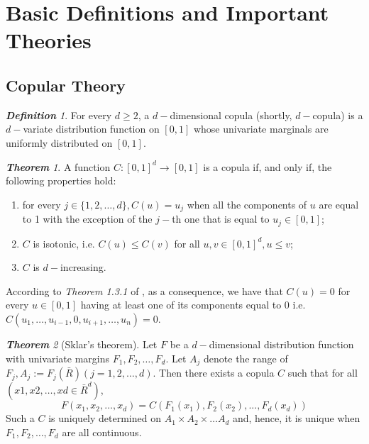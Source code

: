 \documentclass[12pt,oneside,a4paper]{book}
\theoremstyle{definition}
\theoremstyle{remark}
\newtheorem{defn}{\bf Definition}[subsection]
\newtheorem{thm}{\bf Theorem}[subsection]
\begin{document}
		\section{Basic Definitions and Important Theories}
			\subsection{Copular Theory}
				\begin{defn} \label{dfn:copula}\cite{jaworski2010copula}
					For every $d \ge 2$, a $d-$dimensional copula (shortly, $d-$copula) is a
					$d-$variate distribution function on $[0,1]$ whose univariate marginals are uniformly distributed on $[0,1]$.
				\end{defn}

				\begin{thm}
					A function $C: [0,1]^d \rightarrow [0,1]$  is a copula if, and only if, the following properties
					hold:
					\begin{enumerate}
						\item for every $j \in \{1,2, \dots ,d\}, C(u) = u_j$ when all the components of $u$ are
						equal to 1 with the exception of the $j-$th one that is equal to $u_j \in [0,1]$;
						\item $C$ is isotonic, i.e. $C(u) \le C(v)$ for all $u,v \in [0,1]^d, u \le v$;
						\item $C$ is $d-$increasing.
					\end{enumerate}
					According to \textit{Theorem 1.3.1} of \cite{jaworski2010copula}, as a consequence, we have that $C(u)=0$ for every $u \in [0,1]$ having at least one of its components equal to 0 i.e. $C(u_1,\dots,u_{i-1},0,u_{i+1},\dots,u_n)=0$.
				\end{thm}


				\begin{thm}[Sklar's theorem]
					\label{thm:sklar}
					Let $F$ be a $d-$dimensional distribution function with univariate margins $F_1, F_2,\dots, F_d$. Let $A_j$ denote the range of $F_j, A_j := F_j(\bar{R}) (j = 1,2, \dots,d)$. Then there exists a copula $C$ such that for all $(x1,x2, \dots,xd \in \bar{R}^d)$, \\
						\begin{equation}\label{eqn:sklar}
							F(x_1,x_2, \dots ,x_d) =C(F_1(x_1),F_2(x_2), . . . ,F_d(x_d))
						\end{equation}
					Such a $C$ is uniquely determined on $A_1\times A_2\times \dots A_d$ and, hence, it is unique when $F_1, F_2,\dots, F_d$ are all continuous.\cite{jaworski2010copula}
				\end{thm}
\end{document}

